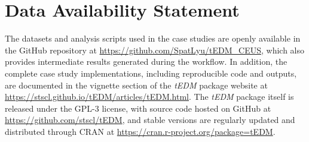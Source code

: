 \documentclass[authoryear,preprint,review,12pt]{elsarticle}
\begin{document}
\section*{Data Availability Statement}

The datasets and analysis scripts used in the case studies are openly available in the GitHub repository at \url{https://github.com/SpatLyu/tEDM_CEUS}, which also provides intermediate results generated during the workflow. In addition, the complete case study implementations, including reproducible code and outputs, are documented in the vignette section of the \textit{tEDM} package website at \url{https://stscl.github.io/tEDM/articles/tEDM.html}. The \textit{tEDM} package itself is released under the GPL-3 license, with source code hosted on GitHub at \url{https://github.com/stscl/tEDM}, and stable versions are regularly updated and distributed through CRAN at \url{https://cran.r-project.org/package=tEDM}.

\baselineskip12pt
 
 


\end{document}
